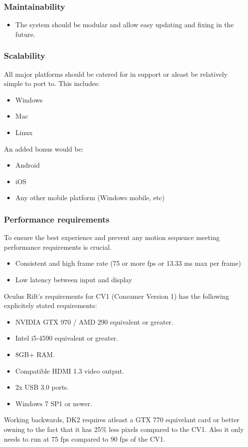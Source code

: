 \documentclass[a4paper,12pt]{article}
\begin{document}
\subsubsection{Maintainability}
	\begin{itemize}
		\item The system should be modular and allow easy updating and fixing in the future.
	\end{itemize}

\subsubsection{Scalability}
All major platforms should be catered for in support or aleast be relatively simple to port to. This includes:
	\begin{itemize}
		\item Windows
		\item Mac
		\item Linux		
	\end{itemize}
An added bonus would be:
	\begin{itemize}
		\item Android
		\item iOS
		\item Any other mobile platform (Windows mobile, etc)
	\end{itemize}
	
\subsubsection{Performance requirements}
To ensure the best experience and prevent any motion sequence meeting performance requirements is crucial.
	\begin{itemize}
		\item Consistent and high frame rate (75 or more fps or 13.33 ms max per frame)
		\item Low latency between input and display
	\end{itemize}
Oculus Rift's requirements for CV1 (Consumer Version 1) has the following explicitely stated requirements:
\begin{itemize}
	\item NVIDIA GTX 970 / AMD 290 equivalent or greater.
	\item Intel i5-4590 equivalent or greater.
	\item 8GB+ RAM.
	\item Compatible HDMI 1.3 video output.
	\item 2x USB 3.0 ports.
	\item Windows 7 SP1 or newer.
\end{itemize}
Working backwards, DK2 requires atleast a GTX 770 equivelant card or better owning to the fact that it has 25\% less pixels compared to the CV1. Also it only needs to run at 75 fps compared to 90 fps of the CV1.
\end{document}
